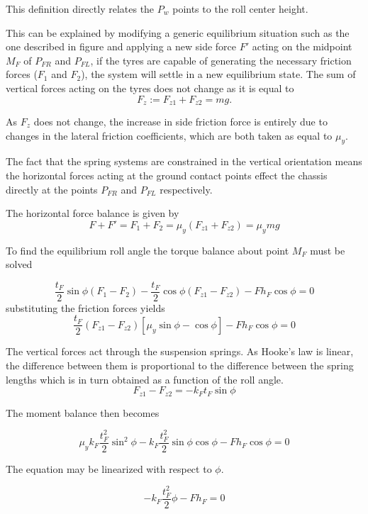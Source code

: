 \textit{}

This definition directly relates the $P_w$ points to the roll center height.

This can be explained by modifying a generic equilibrium situation such as the one described in figure  and applying a new side force $F'$ acting on the midpoint $M_F$ of $P_{FR}$ and $P_{FL}$, if the tyres are capable of generating the necessary friction forces ($F_1$ and $F_2$), the system will settle in a new equilibrium state.
The sum of vertical forces acting on the tyres does not change as it is equal to
$$
F_z := F_{z1}+F_{z2} = mg.
$$

As $F_z$ does not change, the increase in side friction force is entirely due to changes in the lateral friction coefficients, which are both taken as equal to $\mu_y$.

The fact that the spring systems are constrained in the vertical orientation means the horizontal forces acting at the ground contact points effect the chassis directly at the points $P_{FR}$ and $P_{FL}$ respectively.

The horizontal force balance is given by
$$
F + F' = F_1 + F_2 = \mu_y ( F_{z1} + F_{z2} ) = \mu_y mg
$$

To find the equilibrium roll angle the torque balance about point $M_F$ must be solved

$$
\frac{t_F}{2} \sin \phi (F_1-F_2) - \frac{t_F}{2} \cos \phi ( F_{z1} - F_{z2} ) - F h_F  \cos \phi = 0
$$
substituting the friction forces yields
$$
\frac{t_F}{2} ( F_{z1} - F_{z2} ) [\mu_y \sin \phi - \cos \phi ] - F h_F  \cos \phi = 0
$$

The vertical forces act through the suspension springs. As Hooke's law is linear, the difference between them is proportional to the difference between the spring lengths which is in turn obtained as a function of the roll angle.
$$
F_{z1} - F_{z2} = - k_F t_F \sin \phi
$$

The moment balance then becomes

$$
\mu_y k_F \frac{t_F^2}{2} \sin^2 \phi - k_F \frac{t_F^2}{2} \sin \phi \cos \phi - Fh_F \cos \phi = 0
$$

 The equation may be linearized with respect to $\phi$.

$$
- k_F \frac{t_F^2}{2}  \phi  - Fh_F = 0
$$

